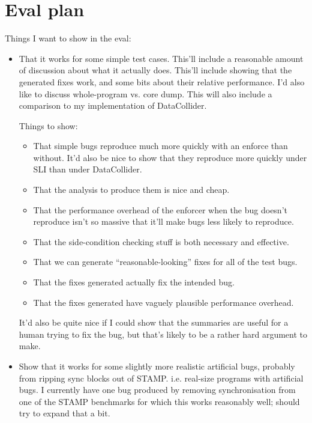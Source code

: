 
\section{Eval plan}

Things I want to show in the eval:

\begin{itemize}
\item That it works for some simple test cases.  This'll include a
  reasonable amount of discussion about what it actually does.
  This'll include showing that the generated fixes work, and some bits
  about their relative performance.  I'd also like to discuss
  whole-program vs. core dump.  This will also include a comparison to
  my implementation of DataCollider.

  Things to show:

  \begin{itemize}
  \item That simple bugs reproduce much more quickly with an enforce
    than without.  It'd also be nice to show that they reproduce more
    quickly under SLI than under DataCollider.
  \item That the analysis to produce them is nice and cheap.
  \item That the performance overhead of the enforcer when the bug
    doesn't reproduce isn't so massive that it'll make bugs less
    likely to reproduce.
  \item That the side-condition checking stuff is both necessary and
    effective.
  \item That we can generate ``reasonable-looking'' fixes for all of
    the test bugs.
  \item That the fixes generated actually fix the intended bug.
  \item That the fixes generated have vaguely plausible performance
    overhead.
  \end{itemize}

  It'd also be quite nice if I could show that the summaries are
  useful for a human trying to fix the bug, but that's likely to be a
  rather hard argument to make.

\item Show that it works for some slightly more realistic artificial
  bugs, probably from ripping sync blocks out of STAMP.
  i.e. real-size programs with artificial bugs.  I currently have one
  bug produced by removing synchronisation from one of the STAMP
  benchmarks for which this works reasonably well; should try to
  expand that a bit.


\end{itemize}
